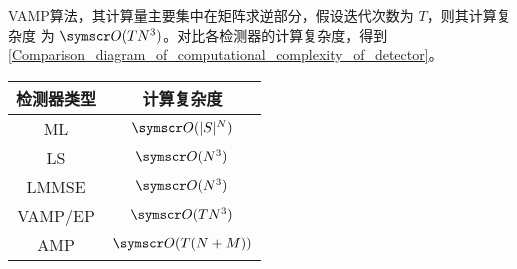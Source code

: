 \documentclass[type=master]{../gdutthesis}
\newcommand{\mscr}{\symscr}
\begin{document}

VAMP算法，其计算量主要集中在矩阵求逆部分，假设迭代次数为 $T$，则其计算复杂度
为 $\mscr O(TN^3)$。对比各检测器的计算复杂度，得到\autoref{Comparison_diagram_of_computational_complexity_of_detector}。

\begin{table}[htbp]
  \label{Comparison_diagram_of_computational_complexity_of_detector}
  \begin{tabular}{cc}
    \toprule
    检测器类型 & 计算复杂度 \\
    \midrule
    ML        & $\mscr O(|S|^N)$ \\
    LS        & $\mscr O(N^3)$   \\
    LMMSE     & $\mscr O(N^3)$   \\
    VAMP/EP   & $\mscr O(TN^3)$   \\
    AMP       & $\mscr O(T(N+M))$   \\
    \bottomrule
    \end{tabular}
\end{table}
\end{document}
